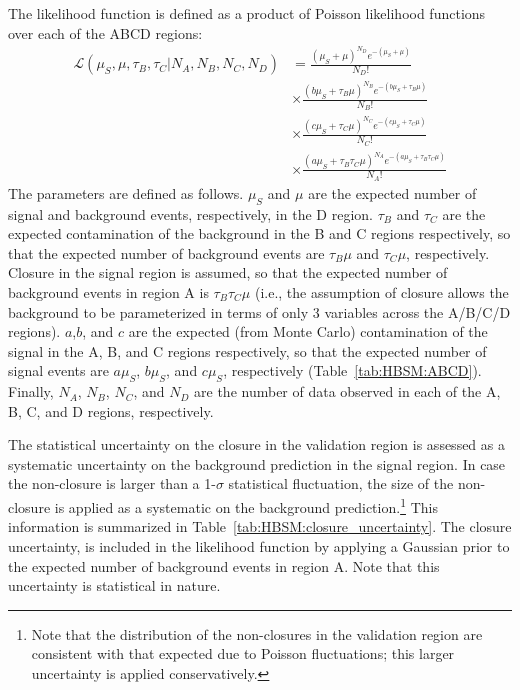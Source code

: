 The likelihood function is defined as a product of Poisson likelihood functions over each of the ABCD regions:
\begin{align}
  \mathcal{L}(\mu_S,\mu,\tau_B,\tau_C|N_A,N_B,N_C,N_D) &= \frac{(\mu_S+\mu)^{N_D}e^{-(\mu_S+\mu)}}{N_D!}\nonumber\\
  &\times\frac{(b\mu_S+\tau_B\mu)^{N_B}e^{-(b\mu_S+\tau_B\mu)}}{N_B!}\nonumber\\
  &\times\frac{(c\mu_S+\tau_C\mu)^{N_C}e^{-(c\mu_S+\tau_C\mu)}}{N_C!}\nonumber\\
  &\times\frac{(a\mu_S+\tau_B\tau_C\mu)^{N_A}e^{-(a\mu_S+\tau_B\tau_C\mu)}}{N_A!}
  \label{eqn:HBSM:likelihood}
\end{align}
The parameters are defined as follows. $\mu_S$ and $\mu$ are the expected number of signal and background events, respectively, in the D region. 
$\tau_B$ and $\tau_C$ are the expected contamination of the background in the B and C regions respectively, 
so that the expected number of background events are $\tau_B\mu$ and $\tau_C\mu$, respectively. 
Closure in the signal region is assumed, 
so that the expected number of background events in region A is $\tau_B\tau_C\mu$ (i.e., the assumption of closure allows the background to be parameterized in terms of only 3 variables across the A/B/C/D regions).
$a$,$b$, and $c$ are the expected (from Monte Carlo) contamination of the signal in the A, B, and C regions respectively, so that the expected number of signal events are $a\mu_S$, $b\mu_S$, and $c\mu_S$, respectively (Table~\ref{tab:HBSM:ABCD}). 
Finally, $N_A$, $N_B$, $N_C$, and $N_D$ are the number of data observed in each of the A, B, C, and D regions, respectively.

The statistical uncertainty on the closure in the validation region is assessed as a systematic uncertainty on the background prediction in the signal region.
In case the non-closure is larger than a 1-$\sigma$ statistical fluctuation, the size of the non-closure is applied as a systematic on the background prediction.\footnote{Note that the distribution of the non-closures in the validation region are consistent with that expected due to Poisson fluctuations; this larger uncertainty is applied conservatively.}
This information is summarized in Table~\ref{tab:HBSM:closure_uncertainty}.
The closure uncertainty, is included in the likelihood function by applying a Gaussian prior
to the expected number of background events in region A.
Note that this uncertainty is statistical in nature.

